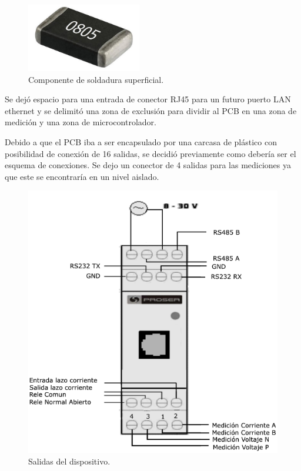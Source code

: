 \begin{figure}[!h]
	\centering
	\includegraphics[width=50mm,keepaspectratio]{Figures/smd0805.jpg}
	\caption{Componente de soldadura superficial.}
	\label{fig:smd0805}
\end{figure}

Se dejó espacio para una entrada de conector RJ45 para un futuro puerto LAN ethernet y se delimitó una zona de exclusión para dividir al PCB en una zona de medición y una zona de microcontrolador.

Debido a que el PCB iba a ser encapsulado por una carcasa de plástico con posibilidad de conexión de 16 salidas, se decidió previamente como debería ser el esquema de conexiones. Se dejo un conector de 4 salidas para las mediciones ya que este se encontraría en un nivel aislado.

\begin{figure}[h]
	\centering
	\includegraphics[width=120mm,keepaspectratio]{Figures/conectores2.png}
	\caption{Salidas del dispositivo.}
	\label{fig:salidas01}
\end{figure}

